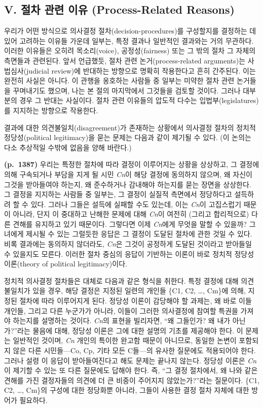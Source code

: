 \documentclass[a4paper,12pt,oneside]{article}  %
\begin{document}
\subsection{V. 절차 관련 이유 (Process-Related
Reasons)}\label{v.-uxc808uxcc28-uxad00uxb828-uxc774uxc720-process-related-reasons}

우리가 어떤 방식으로 의사결정 절차(decision-procedures)를 구성할지를
결정하는 데 있어 고려하는 이유들 가운데 일부는, 특정 결과나 일반적인
결과와는 거의 무관하다. 이러한 이유들은 오히려 목소리(voice),
공정성(fairness) 또는 그 밖의 절차 그 자체의 측면들과 관련된다.
앞서 언급했듯, 절차 관련 논거(process-related arguments)는
사법심사(judicial review)에 반대하는 방향으로 명확히 작용한다고 흔히
간주된다. 이는 완전히 사실은 아니다. 이 관행을 옹호하는 사람들 중 일부는
미약한 절차 관련 논거들을 꾸며내기도 했으며, 나는 본 절의 마지막에서
그것들을 검토할 것이다. 그러나 대부분의 경우 그 반대는 사실이다. 절차
관련 이유들의 압도적 다수는 입법부(legislatures)를 지지하는 방향으로
작용한다.

결과에 대한 의견불일치(disagreement)가 존재하는 상황에서 의사결정 절차의
정치적 정당성(political legitimacy)을 묻는 문제는 다음과 같이 제기될 수
있다. (이 논의는 다소 추상적일 수밖에 없음을 양해 바란다.)

\textbf{(p.~1387)} 우리는 특정한 절차에 따라 결정이 이루어지는 상황을
상상하고, 그 결정에 의해 구속되거나 부담을 지게 될 시민 \emph{Cn}이 해당 결정에
동의하지 않으며, 왜 자신이 그것을 받아들여야 하는지, 왜 준수하거나
감내해야 하는지를 묻는 장면을 상상한다. 그 결정을 지지하는 사람들 중
일부는, 그 결정이 실질적 측면에서 정당하다고 설득하려 할 수 있다. 그러나
그들은 설득에 실패할 수도 있는데, 이는 \emph{Cn}이 고집스럽기 때문이 아니라,
단지 이 중대하고 난해한 문제에 대해 \emph{Cn}이 여전히 (그리고 합리적으로) 다른
견해를 유지하고 있기 때문이다. 그렇다면 이제 \emph{Cn}에게 무엇을 말할 수
있을까? 그녀에게 제시될 수 있는 그럴듯한 응답은 그 결정이 도달된 절차에
관한 것일 수 있다. 비록 결과에는 동의하지 않더라도, \emph{Cn}은 그것이 공정하게
도달된 것이라고 받아들일 수 있을지도 모른다. 이러한 절차 중심의 응답이
기반하는 이론이 바로 정치적 정당성 이론(theory of political
legitimacy)이다.

정치적 의사결정 절차들은 대체로 다음과 같은 형식을 취한다. 특정 결정에
대해 의견불일치가 있을 경우, 해당 결정은 지정된 일련의 개인들 \{C1, C2,
\ldots, Cm\}에 의해, 지정된 절차에 따라 이루어지게 된다. 정당성 이론이
감당해야 할 과제는, 왜 바로 이들 개인들, 그리고 다른 누군가가 아니라,
이들이 그러한 의사결정에 참여할 특권을 가져야 하는지를 설명하는 것이다.
\emph{Cn}의 표현을 빌리자면, ``왜 그들인가? 왜 내가 아닌가?''라는 물음에 대해,
정당성 이론은 그에 대한 설명의 기초를 제공해야 한다. 이 문제는 일반적인
것이며, \emph{Cn} 개인의 특이한 완고함 때문이 아니므로, 동일한 논변이 포함되지
않은 다른 시민들---Co, Cp, 기타 모든 C들---의 유사한 질문에도 적용되어야
한다. 그러나 설령 이 응답이 받아들여진다고 해도 문제는 끝나지 않는다.
정당성 이론은 \emph{Cn}이 제기할 수 있는 또 다른 질문에도 답해야 한다. 즉, ``그
결정 절차에서, 왜 나와 같은 견해를 가진 결정자들의 의견에 더 큰 비중이
주어지지 않았는가?''라는 질문이다. \{C1, C2, \ldots, Cm\}의 구성에 대한
정당화뿐 아니라, 그들이 사용한 결정 절차 자체에 대한 방어가 필요하다.
\end{document}
